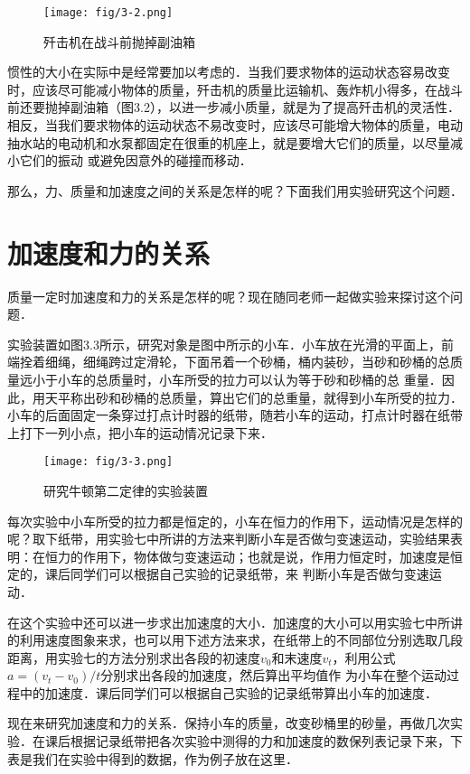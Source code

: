 \begin{figure}[htp]
\centering
\texttt{[image: fig/3-2.png]}
\caption{歼击机在战斗前抛掉副油箱}
\end{figure}

惯性的大小在实际中是经常要加以考虑的．当我们要求物体的运动状态容易改变时，应该尽可能减小物体的质量，歼击机的质量比运输机、轰炸机小得多，在战斗前还要抛掉副油箱（图3.2），以进一步减小质量，就是为了提高歼击机的灵活性．相反，当我们要求物体的运动状态不易改变时，应该尽可能增大物体的质量，电动抽水站的电动机和水泵都固定在很重的机座上，就是要增大它们的质量，以尽量减小它们的振动
或避免因意外的碰撞而移动．

那么，力、质量和加速度之间的关系是怎样的呢？下面我们用实验研究这个问题．


\section{加速度和力的关系}
质量一定时加速度和力的关系是怎样的呢？现在随同老师一起做实验来探讨这个问题．

实验装置如图3.3所示，研究对象是图中所示的小车．小车放在光滑的平面上，前端拴着细绳，细绳跨过定滑轮，下面吊着一个砂桶，桶内装砂，当砂和砂桶的总质量远小于小车的总质量时，小车所受的拉力可以认为等于砂和砂桶的总
重量．因此，用天平称出砂和砂桶的总质量，算出它们的总重量，就得到小车所受的拉力．小车的后面固定一条穿过打点计时器的纸带，随若小车的运动，打点计时器在纸带上打下一列小点，把小车的运动情况记录下来．

\begin{figure}[htp]
\centering
\texttt{[image: fig/3-3.png]}
\caption{研究牛顿第二定律的实验装置}
\end{figure}

每次实验中小车所受的拉力都是恒定的，小车在恒力的作用下，运动情况是怎样的呢？取下纸带，用实验七中所讲的方法来判断小车是否做匀变速运动，实验结果表明：在恒力的作用下，物体做匀变速运动；也就是说，作用力恒定时，加速度是恒定的，课后同学们可以根据自己实验的记录纸带，来
判断小车是否做匀变速运动．

在这个实验中还可以进一步求出加速度的大小．加速度的大小可以用实验七中所讲的利用速度图象来求，也可以用下述方法来求，在纸带上的不同部位分别选取几段距离，用实验七的方法分别求出各段的初速度$v_0$和末速度$v_t$，利用公式$a=(v_t-v_0)/t$分别求出各段的加速度，然后算出平均值作
为小车在整个运动过程中的加速度．课后同学们可以根据自己实验的记录纸带算出小车的加速度．

现在来研究加速度和力的关系．保持小车的质量，改变砂桶里的砂量，再做几次实验．在课后根据记录纸带把各次实验中测得的力和加速度的数保列表记录下来，下表是我们在实验中得到的数据，作为例子放在这里．

